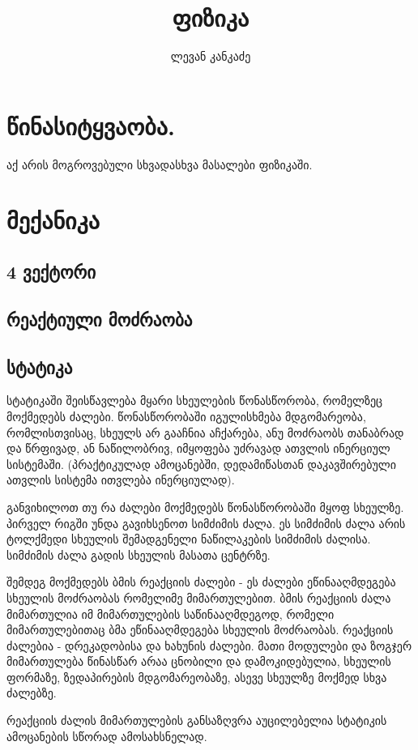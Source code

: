 \documentclass[a4paper]{book}
\title{ფიზიკა}
\author{ლევან კანკაძე}
\begin{document}
\maketitle

\tableofcontents

\chapter{წინასიტყვაობა.}
აქ არის მოგროვებული სხვადასხვა მასალები ფიზიკაში.


\chapter{მექანიკა}
\section{4 ვექტორი}

\section{რეაქტიული მოძრაობა}

\section{სტატიკა} სტატიკაში შეისწავლება მყარი სხეულების წონასწორობა, რომელზეც მოქმედებს ძალები. წონასწორობაში იგულისხმება მდგომარეობა, რომლისთვისაც, სხეულს არ გააჩნია აჩქარება, ანუ მოძრაობს თანაბრად და წრფივად, ან ნაწილობრივ, იმყოფება უძრავად ათვლის ინერციულ სისტემაში. (პრაქტიკულად ამოცანებში, დედამიწასთან დაკავშირებული ათვლის სისტემა ითვლება ინერციულად).

განვიხილოთ თუ რა ძალები მოქმედებს წონასწორობაში მყოფ სხეულზე. პირველ რიგში უნდა გავიხსენოთ სიმძიმის ძალა. ეს სიმძიმის ძალა არის ტოლქმედი სხეულის შემადგენელი ნაწილაკების სიმძიმის ძალისა. სიმძიმის ძალა გადის სხეულის მასათა ცენტრზე. 
	
შემდეგ მოქმედებს ბმის რეაქციის ძალები - ეს ძალები ეწინააღმდეგება სხეულის მოძრაობას რომელიმე მიმართულებით. ბმის რეაქციის ძალა მიმართულია იმ მიმართულების საწინააღმდეგოდ, რომელი მიმართულებითაც ბმა ეწინააღმდეგება სხეულის მოძრაობას. რეაქციის ძალებია - დრეკადობისა და ხახუნის ძალები. მათი მოდულები და ზოგჯერ მიმართულება წინასწარ არაა ცნობილი და დამოკიდებულია, სხეულის ფორმაზე, ზედაპირების მდგომარეობაზე, ასევე სხეულზე მოქმედ სხვა ძალებზე.
	
რეაქციის ძალის მიმართულების განსაზღვრა აუცილებელია სტატიკის ამოცანების სწორად ამოსახსნელად.	
\end{document}
